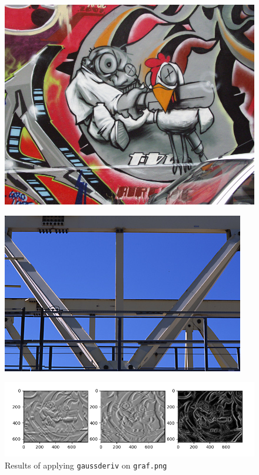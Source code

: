 \documentclass{article}
\begin{document}
\begin{figure}[ht]
    \centering
    \begin{minipage}{.5\textwidth}
      \centering
      \includegraphics[width=.6\linewidth]{images/Q1.e-graf.png}
      \label{fig:graf.png}
    \end{minipage}%
    \begin{minipage}{.5\textwidth}
      \centering
      \includegraphics[width=.6\linewidth]{images/Q1.e-gantrycrane.png}
      \label{fig:gantrycrane.png}
    \end{minipage}
\end{figure}

\begin{figure}[ht]
    \centering
    \includegraphics[width=\textwidth]{images/Q1.e-graf-gaussderived.png}
    \cprotect\caption{Results of applying \verb|gaussderiv| on \verb|graf.png|}
    \label{fig:gaussderiv-graf.png}
\end{figure}
\end{document}
